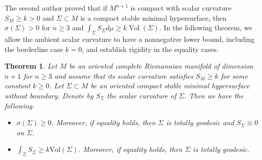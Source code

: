 \documentclass[amssymb,amstex,amsmath,11pt]{article}
\numberwithin{equation}{section}
\theoremstyle{plain}
\newtheorem{thm}{Theorem}[section]
\theoremstyle{definition}
\theoremstyle{remark}
\newcommand{\is}{\int_{\Sigma}}
\begin{document}
The second author \cite[Theorem 1.4]{Seo12} proved that if $M^{n+1}$ is compact with scalar curvature $S_M\ge k>0$ and $\Sigma\subset M$ is a compact stable minimal hypersurface, then  $\sigma(\Sigma)>0$ for $n\ge3$ and $\int_\Sigma S_\Sigma d\mu \ge k\operatorname{Vol}(\Sigma)$. In the following theorem, we allow the ambient scalar curvature to have a nonnegative lower bound, including the borderline case $k=0$, and establish rigidity in the equality cases.








\begin{thm}  \label{thmc}
Let $M$ be an oriented complete Riemannian manifold of dimension $n+1$ for $n\ge 3$ and assume that its scalar curvature satisfies $S_M\ge k$ for some constant $k\ge 0$. Let $\Sigma\subset M$ be an oriented compact stable minimal hypersurface without boundary. Denote by $S_\Sigma$ the scalar curvature of $\Sigma$. Then we have the following.
    \begin{itemize}
        \item[{\rm (i)}] $\sigma(\Sigma)\geq0$. Moreover, if equality holds, then $\Sigma$ is totally geodesic and $S_\Sigma\equiv 0$ on $\Sigma$.
        \item[{\rm (ii)}] $\is S_{\Sigma} \geq k \mathrm{Vol} (\Sigma)$. Moreover, if equality holds, then $\Sigma$ is totally geodesic.
    \end{itemize}
\end{thm}
\end{document}
